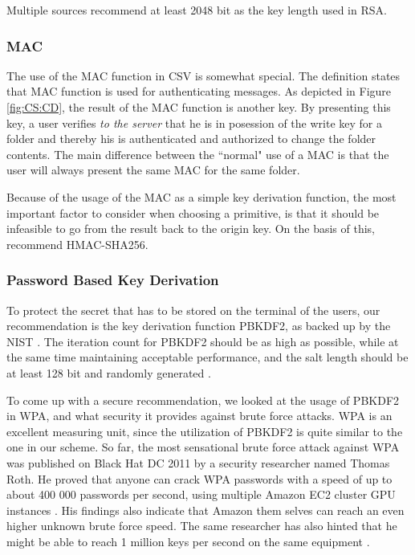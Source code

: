 \documentclass[pdftex,english,10pt,b5paper,twoside]{book}
\begin{document}
Multiple sources \cite{keylength} recommend at least 2048 bit as the key length
used in \ac{RSA}.

\subsubsection{\ac{MAC}}

The use of the \ac{MAC} function in \ac{CSV} is somewhat special. The
definition states that MAC function is used for authenticating messages.  As
depicted in Figure \ref{fig:CS:CD}, the result of the \ac{MAC} function is
another key. By presenting this key, a user verifies \emph{to the server} that
he is in posession of the write key for a folder and thereby his is
authenticated and authorized to change the folder contents. The main difference
between the ``normal" use of a \ac{MAC} is that the user will always present
the same \ac{MAC} for the same folder.

Because of the usage of the \ac{MAC} as a simple key derivation function, the
most important factor to consider when choosing a primitive, is that it should
be infeasible to go from the result back to the origin key. On the basis of
this, \citet{schneier} recommend HMAC-SHA256.

\subsubsection{Password Based Key Derivation} 
\label{sec:PBKD}

To protect the secret that has to be stored on the terminal of the users, our
recommendation is the key derivation function \ac{PBKDF2}, as backed up by the
\ac{NIST} \cite{pbkdf_nist}. The iteration count for \ac{PBKDF2} should be as
high as possible, while at the same time maintaining acceptable performance,
and the salt length should be at least 128 bit and randomly generated
\cite{pbkdf_nist}. 

To come up with a secure recommendation, we looked at the usage of \ac{PBKDF2}
in \ac{WPA}, and what security it provides against brute force attacks.
\ac{WPA} is an excellent measuring unit, since the utilization of \ac{PBKDF2}
is quite similar to the one in our scheme. So far, the most sensational brute
force attack against \ac{WPA} was published on Black Hat DC 2011 by a security
researcher named Thomas Roth. He proved that anyone can crack \ac{WPA}
passwords with a speed of up to about 400 000 passwords per second, using
multiple Amazon \ac{EC2} cluster \ac{GPU} instances \cite{rothwpa}. His
findings also indicate that Amazon them selves can reach an even higher unknown
brute force speed. The same researcher has also hinted that he might be able to
reach 1 million keys per second on the same equipment \cite{rothblog}.
\end{document}
